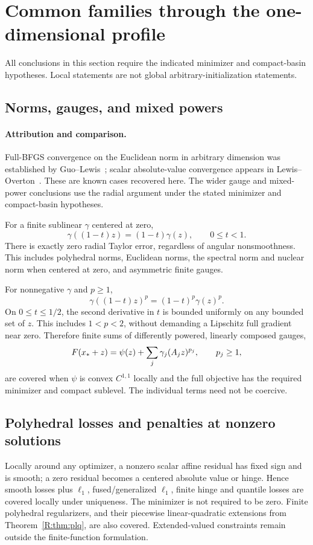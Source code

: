 \setcounter{section}{5}
\setcounter{theorem}{0}
\setcounter{equation}{8}
\section{Common families through the one-dimensional profile}
All conclusions in this section require the indicated minimizer and compact-basin hypotheses. Local statements are not global arbitrary-initialization statements.

\subsection{Norms, gauges, and mixed powers}
\paragraph{Attribution and comparison.}
Full-BFGS convergence on the Euclidean norm in arbitrary dimension was established by Guo--Lewis~\cite[Corollary~4.2]{GL18}; scalar absolute-value convergence appears in Lewis--Overton~\cite[Section~5.1]{LO}. These are known cases recovered here. The wider gauge and mixed-power conclusions use the radial argument under the stated minimizer and compact-basin hypotheses.

For a finite sublinear $\gamma$ centered at zero,
\[
 \gamma((1-t)z)=(1-t)\gamma(z),\qquad 0\le t<1.
\]
There is exactly zero radial Taylor error, regardless of angular nonsmoothness. This includes polyhedral norms, Euclidean norms, the spectral norm and nuclear norm when centered at zero, and asymmetric finite gauges.

For nonnegative $\gamma$ and $p\ge1$,
\[
 \gamma((1-t)z)^p=(1-t)^p\gamma(z)^p.
\]
On $0\le t\le1/2$, the second derivative in $t$ is bounded uniformly on any bounded set of $z$. This includes $1<p<2$, without demanding a Lipschitz full gradient near zero. Therefore finite sums of differently powered, linearly composed gauges,
\[
 F(x_*+z)=\psi(z)+\sum_j\gamma_j(A_jz)^{p_j},\qquad p_j\ge1,
\]
are covered when $\psi$ is convex $C^{1,1}$ locally and the full objective has the required minimizer and compact sublevel. The individual terms need not be coercive.

\subsection{Polyhedral losses and penalties at nonzero solutions}
Locally around any optimizer, a nonzero scalar affine residual has fixed sign and is smooth; a zero residual becomes a centered absolute value or hinge. Hence smooth losses plus $\ell_1$, fused/generalized $\ell_1$, finite hinge and quantile losses are covered locally under uniqueness. The minimizer is not required to be zero. Finite polyhedral regularizers, and their piecewise linear-quadratic extensions from Theorem~\ref{R:thm:plq}, are also covered. Extended-valued constraints remain outside the finite-function formulation.

